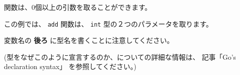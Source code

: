 関数は、0個以上の引数を取ることができます。

この例では、 \texttt{add} 関数は、 \texttt{int} 型の２つのパラメータを取ります。

変数名の {\large {\textbf{後ろ}}} に型名を書くことに注意してください。

(型をなぜこのように宣言するのか、についての詳細な情報は、 記事「Go's declaration syntax」 を参照してください。)